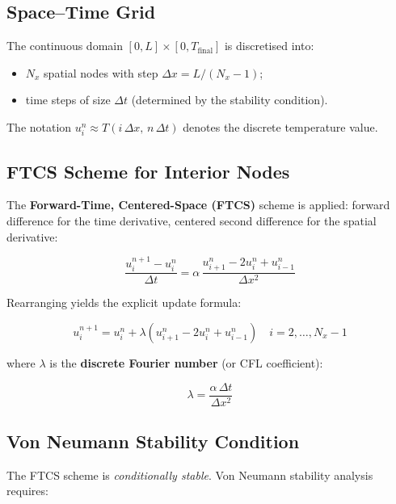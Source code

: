 \documentclass[11pt, a4paper]{scrartcl}
\begin{document}
\begin{onehalfspace}
\subsection{Space--Time Grid}

The continuous domain $[0,L] \times [0, T_\text{final}]$ is discretised into:
\begin{itemize}
  \item $N_x$ spatial nodes with step $\Delta x = L / (N_x - 1)$;
  \item time steps of size $\Delta t$ (determined by the stability condition).
\end{itemize}

The notation $u_i^n \approx T(i\,\Delta x,\, n\,\Delta t)$ denotes the discrete temperature value.

\subsection{FTCS Scheme for Interior Nodes}

The \textbf{Forward-Time, Centered-Space (FTCS)} scheme is applied: forward difference for the time derivative, centered second difference for the spatial derivative:

\begin{equation}
  \frac{u_i^{n+1} - u_i^n}{\Delta t} = \alpha \, \frac{u_{i+1}^n - 2u_i^n + u_{i-1}^n}{\Delta x^2}
  \label{eq:ftcs}
\end{equation}

Rearranging yields the explicit update formula:

\begin{equation}
  \boxed{
    u_i^{n+1} = u_i^n + \lambda \left( u_{i+1}^n - 2u_i^n + u_{i-1}^n \right)
  }
  \quad i = 2, \ldots, N_x - 1
  \label{eq:ftcs_explicit}
\end{equation}

where $\lambda$ is the \textbf{discrete Fourier number} (or CFL coefficient):

\begin{equation}
  \lambda = \frac{\alpha\, \Delta t}{\Delta x^2}
  \label{eq:lambda}
\end{equation}

\subsection{Von Neumann Stability Condition}

The FTCS scheme is \emph{conditionally stable}. Von Neumann stability analysis requires:


\end{onehalfspace}
\end{document}
